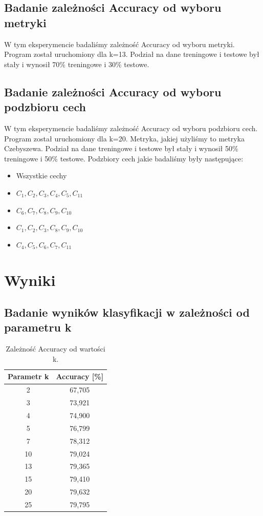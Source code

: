 \documentclass{classrep}
\begin{document}
\subsection{Badanie zależności Accuracy od wyboru metryki}

W tym eksperymencie badaliśmy zależność Accuracy od wyboru metryki. Program został uruchomiony dla k=13. Podział na dane treningowe i testowe był stały i wynosił 70\% treningowe i 30\% testowe.

\subsection{Badanie zależności Accuracy od wyboru podzbioru cech}

W tym eksperymencie badaliśmy zależność Accuracy od wyboru podzbioru cech. Program został uruchomiony dla k=20. Metryka, jakiej użyliśmy to metryka Czebyszewa. Podział na dane treningowe i testowe był stały i wynosił 50\% treningowe i 50\% testowe. Podzbiory cech jakie badaliśmy były następujące:
\begin{itemize}
	\item Wszystkie cechy
	\item $C_1, C_2, C_3, C_4, C_5, C_{11}$
	\item $C_6, C_7, C_8, C_9, C_{10}$ 
	\item $C_1, C_2, C_3, C_8, C_9, C_{10}$
	\item $C_4, C_5, C_6, C_7, C_{11}$
\end{itemize}


\section{Wyniki} %
\subsection{Badanie wyników klasyfikacji w zależności od parametru k}
\begin{table}[h!]
	\centering
	\begin{tabular} {c c}
		\hline
		\textbf{Parametr k} & \textbf{Accuracy [\%]} \\ [0.5ex] 
		\hline
		\hline 
		2 & 67,705 \\ 
		3 & 73,921 \\
		4 & 74,900 \\
		5 & 76,799 \\
		7 & 78,312 \\
		10 & 79,024 \\
		13 & 79,365 \\
		15 & 79,410 \\
		20 & 79,632 \\
		25 & 79,795 \\
		\hline
	\end{tabular}
	\caption{Zależność Accuracy od wartości k. }
	\label{tabelaK}
\end{table}
\end{document}
